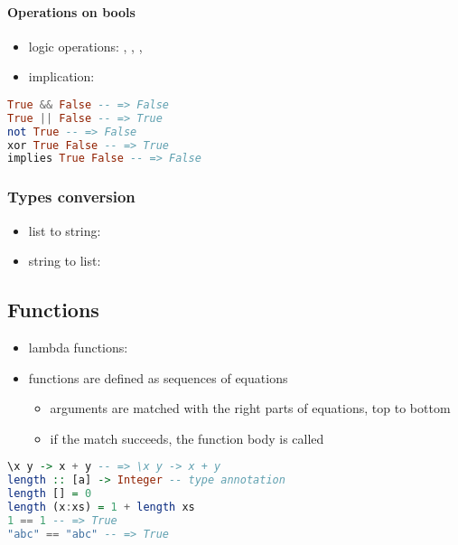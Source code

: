 \documentclass[a4paper,landscape,10pt]{article}
\begin{document}
\begin{multicols*}{2}
  \breakcolumn

  \paragraph{Operations on bools}

  \begin{itemize}
    \item logic operations: \ihaskell{&&}, \ihaskell{||}, , 
    \item implication: 
  \end{itemize}

  \begin{lstlisting}[language=Haskell]
True && False -- => False
True || False -- => True
not True -- => False
xor True False -- => True
implies True False -- => False
\end{lstlisting}

  \subsubsection{Types conversion}

  \begin{itemize}
    \item list to string: 
    \item string to list: 
  \end{itemize}

  \subsection{Functions}

  \begin{itemize}
    \item lambda functions: 
    \item functions are defined as sequences of equations
          \begin{itemize}
            \item arguments are matched with the right parts of equations, top to bottom
            \item if the match succeeds, the function body is called
          \end{itemize}
  \end{itemize}

  \begin{lstlisting}[language=Haskell]
\x y -> x + y -- => \x y -> x + y
length :: [a] -> Integer -- type annotation
length [] = 0
length (x:xs) = 1 + length xs
1 == 1 -- => True
"abc" == "abc" -- => True
\end{lstlisting}


\end{multicols*}
\end{document}
